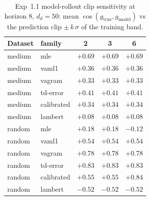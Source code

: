 \begin{table}[htbp]
\centering
\caption{Exp~1.1 model-rollout clip sensitivity at horizon 8, $d_d = 50$: mean $\cos(g_{\text{true}}, g_{\text{model}})$ vs the prediction clip $\pm\,k\,\sigma$ of the training band.}
\label{tab:h11clip}
\begin{tabular}{llccc}
\toprule
Dataset & family & 2 & 3 & 6 \\
\midrule
medium & mle & $+0.69$ & $+0.69$ & $+0.69$ \\
medium & vaml1 & $+0.36$ & $+0.36$ & $+0.36$ \\
medium & vagram & $+0.33$ & $+0.33$ & $+0.33$ \\
medium & td-error & $+0.41$ & $+0.41$ & $+0.41$ \\
medium & calibrated & $+0.34$ & $+0.34$ & $+0.34$ \\
medium & lambert & $+0.08$ & $+0.08$ & $+0.08$ \\
random & mle & $+0.18$ & $+0.18$ & $-0.12$ \\
random & vaml1 & $+0.54$ & $+0.54$ & $+0.54$ \\
random & vagram & $+0.78$ & $+0.78$ & $+0.78$ \\
random & td-error & $+0.83$ & $+0.83$ & $+0.83$ \\
random & calibrated & $+0.55$ & $+0.55$ & $+0.84$ \\
random & lambert & $-0.52$ & $-0.52$ & $-0.52$ \\
\bottomrule
\end{tabular}
\end{table}
